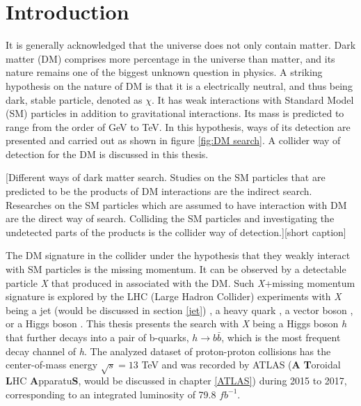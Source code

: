 \documentclass[class=NCU_thesis, crop=false]{standalone}
\begin{document}
	
	
\chapter{Introduction}
	It is generally acknowledged that the universe does not only contain matter. Dark matter (DM) \cite{hep-ph/0404175} comprises more percentage in the universe than matter, and its nature remains one of the biggest unknown question in physics. A striking hypothesis on the nature of DM \cite{STEIGMAN1985375, PhysRevD.33.1585} is that it is a electrically neutral, and thus being dark, stable particle, denoted as $\chi$. It has weak interactions with Standard Model (SM) particles in addition to gravitational interactions. Its mass is predicted to range from the order of GeV to TeV. In this hypothesis, ways of its detection are presented and carried out as shown in figure \ref{fig:DM search}. A collider way of detection for the DM \cite{1507.00966} is discussed in this thesis.
	
	[Different ways of dark matter search. Studies on the SM particles that are predicted to be the products of DM interactions are the indirect search. Researches on the SM particles which are assumed to have interaction with DM are the direct way of search. Colliding the SM particles and investigating the undetected parts of the products is the collider way of detection.][short caption]
	
	\newpage
	
	The DM signature in the collider under the hypothesis that they weakly interact with SM particles is the missing momentum. It can be observed by a detectable particle \textit{X} that produced in associated with the DM. Such \textit{X}+missing momentum signature is explored by the LHC (Large Hadron Collider) experiments with \textit{X} being a jet (would be discussed in section \ref{jet}) \cite{1711.03301, 1712.02345}, a heavy quark \cite{1710.11412, 1711.11520, 1801.08427, 1706.02581}, a vector boson \cite{1712.02345, 1704.03848, 1708.09624, 1711.00431, 1706.03794, 1701.02042}, or a Higgs boson \cite{1706.03948, 1707.01302, 1806.04771, 1703.05236}. This thesis presents the search with \textit{X} being a Higgs boson \textit{h} that further decays into a pair of b-quarks, $h \rightarrow b\bar{b}$, which is the most frequent decay channel of \textit{h}. The analyzed dataset of proton-proton collisions has the center-of-mass energy $\sqrt{s} = 13$ TeV and was recorded by ATLAS (\textbf{A} \textbf{T}oroidal \textbf{L}HC \textbf{A}pparatu\textbf{S}, would be discussed in chapter \ref{ATLAS}) during 2015 to 2017, corresponding to an integrated luminosity of 79.8 $fb^{-1}$.
	
\end{document}
